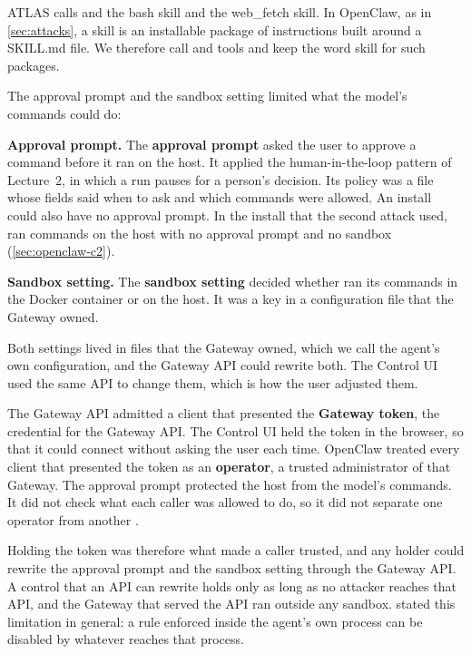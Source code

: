ATLAS calls  and  the bash skill and the web\_fetch skill. In
OpenClaw, as in \cref{sec:attacks}, a skill is an installable package of instructions built around a
SKILL.md file. We therefore call  and  tools and keep the word
skill for such packages.

The approval prompt and the sandbox setting limited what the model's commands could do:
\bi
\item \textbf{Approval prompt.} The \textbf{approval prompt} asked the user to approve a command
before it ran on the host. It applied the human-in-the-loop pattern of Lecture~2, in which a run
pauses for a person's decision. Its policy was a file whose fields said when to ask and which
commands were allowed. An install could also have no approval prompt. In the install that the
second attack used,  ran commands on the host with no approval prompt and no sandbox
(\cref{sec:openclaw-c2}).
\item \textbf{Sandbox setting.} The \textbf{sandbox setting} decided whether  ran its
commands in the Docker container or on the host. It was a key in a configuration file that the
Gateway owned.
\ei

Both settings lived in files that the Gateway owned, which we call the agent's own configuration,
and the Gateway API could rewrite both. The Control UI used the same API to change them, which is
how the user adjusted them.

The Gateway API admitted a client that presented the \textbf{Gateway token}, the credential for the
Gateway API. The Control UI held the token in the browser, so that it could connect without asking
the user each time. OpenClaw treated every client that presented the token as an
\textbf{operator}, a trusted administrator of that Gateway. The approval prompt protected the host
from the model's commands. It did not check what each caller was allowed to do, so it did not
separate one operator from another \citep{openclaw-docs-exec-approvals}.

Holding the token was therefore what made a caller trusted, and any holder could rewrite the
approval prompt and the sandbox setting through the Gateway API. A control that an API can rewrite
holds only as long as no attacker reaches that API, and the Gateway that served the API ran outside
any sandbox.  stated this limitation in general: a rule enforced inside the agent's own
process can be disabled by whatever reaches that process.

